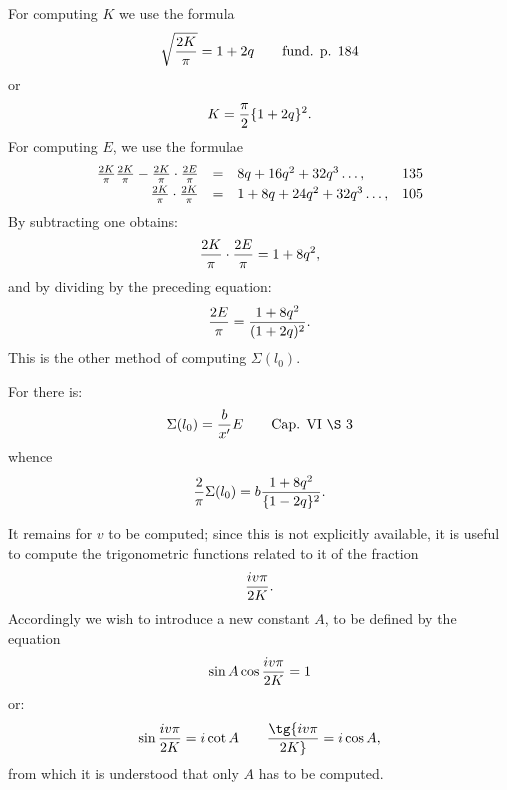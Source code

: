\begingroup\small
{}

For computing $K$ we use the formula
\[
 \sqrt{2K\over\pi}=1+2q \qquad \text{fund. p. 184}
\]
or
\[
 K={\pi\over2}\{1+2q\}^2.
\]
For computing $E$, we use the formulae
\[
\begin{array}{rcll}
 {2K\over\pi}{2K\over\pi}-{2K\over\pi}\cdot {2E\over\pi}&=&8q+16q^2+32q^3\ldots, &135\vspace{0.2em}\\
 {2K\over\pi}\cdot{2K\over\pi}&=&1+8q+24q^2+32q^3\ldots, &105
\end{array}
\]
By subtracting one obtains:
\[
 {2K\over\pi}\cdot {2E\over\pi}=1+8q^2,
\]
and by dividing by the preceding equation:
\[
 {2E\over\pi}={1+8q^2\over (1+2q)^2}.
\]
This is the other method of computing $\Sigma(l_0)$.

For there is:
\[
 \Sigma(l_0)={b\over x'}E \qquad \text{Cap. VI \S\ 3}
\]
whence
\[
 {2\over\pi}\Sigma(l_0)=b{1+8q^2\over \{1-2q\}^2}.
\]


It remains for $v$ to be computed; since this is not explicitly available, it is useful to compute the trigonometric functions related to it of the fraction
\[
 {iv\pi\over2K}.
\]
Accordingly we wish to introduce a new constant $A$, to be defined by the equation
\[
 \sin A\cos {iv\pi\over2K}=1
\]
or:
\[
 \sin {iv\pi\over2K}=i\cot A
 \qquad
 \tg {iv\pi\over2K}=i\cos A,
\]
from which it is understood that only $A$ has to be computed.
\endgroup
